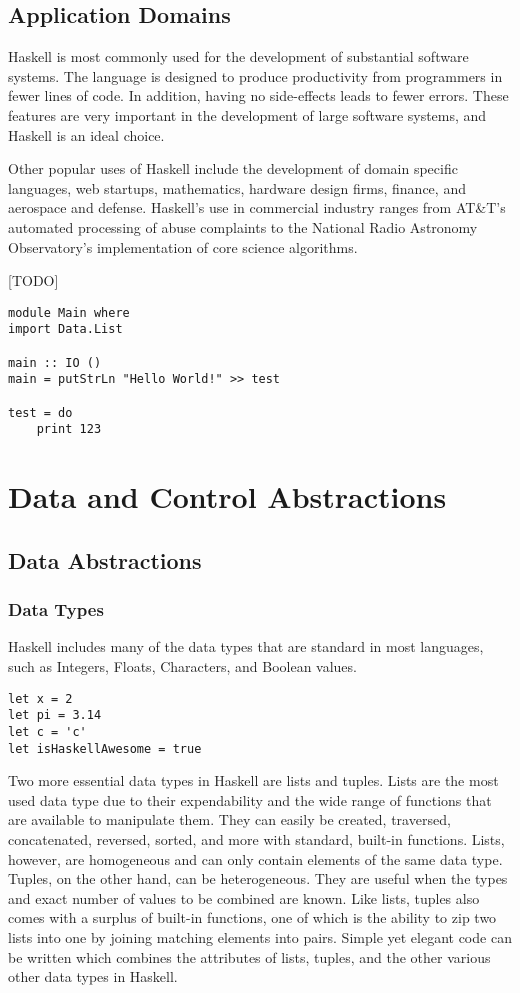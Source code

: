 \documentclass[titlepage,12pt]{article}
\begin{document}
\subsection{Application Domains}

Haskell is most commonly used for the development of substantial software systems. The language is designed to produce productivity from programmers in fewer lines of code. In addition, having no side-effects leads to fewer errors. These features are very important in the development of large software systems, and Haskell is an ideal choice. 

Other popular uses of Haskell include the development of domain specific languages, web startups, mathematics, hardware design firms, finance, and aerospace and defense. Haskell's use in commercial industry ranges from AT\&T's automated processing of abuse complaints to the National Radio Astronomy Observatory’s implementation of core science algorithms.

[TODO]~\cite{learnyouahaskell}
\begin{verbatim}
module Main where
import Data.List

main :: IO ()
main = putStrLn "Hello World!" >> test

test = do 
    print 123
\end{verbatim}

\section{Data and Control Abstractions}

\subsection{Data Abstractions}
\subsubsection{Data Types}

Haskell includes many of the data types that are standard in most languages, such as Integers, Floats, Characters, and Boolean values. 

\begin{verbatim}
let x = 2
let pi = 3.14
let c = 'c'
let isHaskellAwesome = true
\end{verbatim}

Two more essential data types in Haskell are lists and tuples. Lists are the most used data type due to their expendability and the wide range of functions that are available to manipulate them. They can easily be created, traversed, concatenated, reversed, sorted, and more with standard, built-in functions. Lists, however, are homogeneous and can only contain elements of the same data type. Tuples, on the other hand, can be heterogeneous. They are useful when the types and exact number of values to be combined are known. Like lists, tuples also comes with a surplus of built-in functions, one of which is the ability to zip two lists into one by joining matching elements into pairs. Simple yet elegant code can be written which combines the attributes of lists, tuples, and the other various other data types in Haskell.
\end{document}
